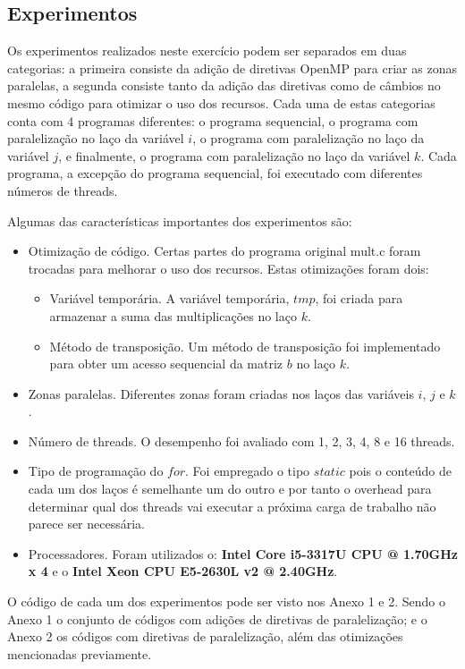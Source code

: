 \documentclass[a4paper,12pt,fleqn]{article}
\begin{document}
\subsection{Experimentos} 
Os experimentos realizados neste exercício podem ser separados em duas categorias: a primeira consiste da adição de diretivas OpenMP para criar as zonas paralelas, a segunda consiste tanto da adição das  diretivas como de câmbios no mesmo código para otimizar o uso dos recursos. Cada uma de estas categorias conta com 4 programas diferentes: o programa sequencial, o programa com paralelização no laço da variável $i$, o programa com paralelização no laço da variável $j$, e finalmente, o programa com paralelização no laço da variável $k$. Cada programa, a excepção do programa sequencial, foi executado com diferentes números de threads.  
 
Algumas das características importantes dos experimentos são: 
\begin{itemize} 
    \item Otimização de código. Certas partes do programa original mult.c foram trocadas para melhorar o uso dos recursos. Estas otimizações foram dois: 
    \begin{itemize}
        \item Variável temporária. A variável temporária, $tmp$, foi criada para armazenar a suma das multiplicações no laço $k$.
        \item Método de transposição. Um método de transposição foi implementado para obter um acesso sequencial da matriz $b$ no laço $k$.
    \end{itemize}
    \item Zonas paralelas. Diferentes zonas foram criadas nos laços das variáveis $i$, $j$ e $k$.  
    \item Número de threads. O desempenho foi avaliado com 1, 2, 3, 4, 8 e 16 threads.   
    \item Tipo de programação do $for$. Foi empregado o tipo $static$ pois o conteúdo de cada um dos laços é semelhante um do outro e por tanto o overhead para determinar qual dos threads vai executar a próxima carga de trabalho não parece ser necessária.
    \item Processadores. Foram utilizados o: \textbf{Intel Core i5-3317U CPU @ 1.70GHz x 4} e o \textbf{Intel Xeon CPU E5-2630L v2 @ 2.40GHz}.
\end{itemize} 

O código de cada um dos experimentos pode ser visto nos Anexo 1 e 2. Sendo o Anexo 1 o conjunto de códigos com adições de diretivas de paralelização; e o Anexo 2 os códigos com diretivas de paralelização, além das otimizações mencionadas previamente.  
\end{document}
